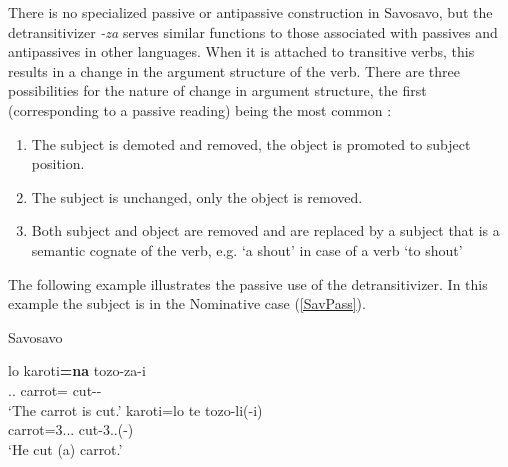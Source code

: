 There is no specialized passive or antipassive construction in Savosavo, but the detransitivizer \emph{-za} serves similar functions to those associated with passives and antipassives in other languages. When it is attached to transitive verbs, this results in a change in the argument structure of the verb. 
There are three possibilities for the nature of change in argument structure, the first (corresponding to a passive reading) being the most common \citep[171]{Wegener:2008}:

\begin{enumerate}
\item The subject is demoted and removed, the object is promoted to subject position.
\item The subject is unchanged, only the object is removed.
\item Both subject and object are removed and are replaced by a subject that is a semantic
cognate of the verb, e.g. `a shout' in case of a verb `to shout'
\end{enumerate} 

The following example illustrates the passive use of the detransitivizer. 
In this example the subject is in the Nominative  case (\ref{SavPass}).

\begin{exe}\ex\label{SavPass} {Savosavo} \citep[171]{Wegener:2008}\nopagebreak[4]
\begin{xlist}
\ex\gll lo karoti\textbf{=na} tozo-za-i\\
\deter{}.\sg{}.\mas{} carrot=\nom{} cut-\detr{}-\fin{}\\
`The carrot is cut.'
\ex\gll karoti=lo te tozo-li(-i)\\
carrot=3.\sg{}.\mas{}.\nom{} \emphat{} cut-3\sg{}.\mas{}.\obj{}(-\fin{})\\
`He cut (a) carrot.'
\end{xlist}
\end{exe}


